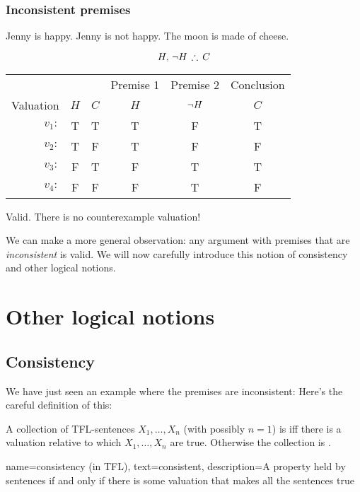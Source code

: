 \subsection{Inconsistent premises}
\begin{earg}
	\prem Jenny is happy.
	\prem Jenny is not happy.
	\conc The moon is made of cheese.
\end{earg}

$$H,\,\enot H\,\therefore\, C$$

\begin{center}
	\begin{tabular}{r c c | c | c | c}
		&&& Premise 1 & Premise 2 & Conclusion\\
		Valuation& $H$ & $C$ & $H$ & $\neg H$ & $C$\\[.3em]
		\hline
		$v_1:$ & T & T & T & F & T\\
		$v_2:$ & T & F & T & F & F\\
		$v_3:$ & F & T & F & T & T\\
		$v_4:$ & F & F & F & T & F\\
	\end{tabular}
\end{center}
Valid. There is no counterexample valuation!

We can make a more general observation: any argument with premises that are \emph{inconsistent} is valid. We will now carefully introduce this notion of consistency and other logical notions. 

\chapter{Other logical notions}

\section{Consistency}

We have just seen an example where the premises are inconsistent: Here's the careful definition of this:


\begin{highlighted}
	A collection of TFL-sentences $X_1,\ldots,X_n$ (with possibly $n=1$) is  iff there is a valuation relative to which $X_1,\ldots,X_n$ are true. Otherwise the collection is .
\end{highlighted}

{
	name=consistency (in TFL),
	text=consistent,
	description={A property held by sentences if and only if there is some \gls{valuation} that makes all the sentences true}
}




